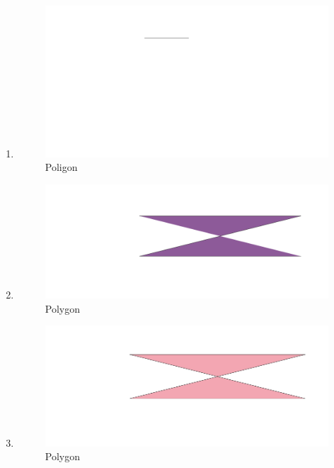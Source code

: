 \begin{enumerate}
	\item 
	
	\begin{figure}[H]
		\includegraphics[width=12cm]{figures/1174056/6.PNG}
		\centering
		\caption{Poligon}
	\end{figure}
	
	\item 
	
	\begin{figure}[H]
		\includegraphics[width=12cm]{figures/1174056/7.PNG}
		\centering
		\caption{Polygon}
	\end{figure}
	
	\item 
	
	\begin{figure}[H]
		\includegraphics[width=12cm]{figures/1174056/8.PNG}
		\centering
		\caption{Polygon}
	\end{figure}
	

\end{enumerate}
